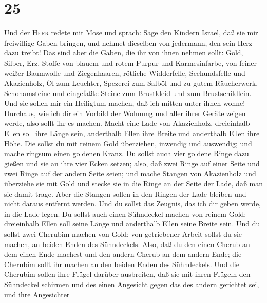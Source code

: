 \hypertarget{section-24}{%
\section{25}\label{section-24}}

 Und der \textsc{Herr} redete mit Mose und sprach:
 Sage den Kindern Israel, daß sie mir freiwillige Gaben
bringen, und nehmet dieselben von jedermann, den sein Herz dazu treibt!
 Das sind aber die Gaben, die ihr von ihnen nehmen sollt:
 Gold, Silber, Erz, Stoffe von blauem und rotem Purpur und
Karmesinfarbe, von feiner weißer Baumwolle und Ziegenhaaren,
 rötliche Widderfelle, Seehundsfelle und Akazienholz,
 Öl zum Leuchter, Spezerei zum Salböl und zu gutem
Räucherwerk,  Schohamsteine und eingefaßte Steine zum
Brustkleid und zum Brustschildlein.  Und sie sollen mir
ein Heiligtum machen, daß ich mitten unter ihnen wohne! 
Durchaus, wie ich dir ein Vorbild der Wohnung und aller ihrer Geräte
zeigen werde, also sollt ihr es machen.  Macht eine Lade
von Akazienholz, dreieinhalb Ellen soll ihre Länge sein, anderthalb
Ellen ihre Breite und anderthalb Ellen ihre Höhe.  Die
sollst du mit reinem Gold überziehen, inwendig und auswendig; und mache
ringsum einen goldenen Kranz.  Du sollst auch vier
goldene Ringe dazu gießen und sie an ihre vier Ecken setzen; also, daß
zwei Ringe auf einer Seite und zwei Ringe auf der andern Seite seien;
 und mache Stangen von Akazienholz und überziehe sie mit
Gold  und stecke sie in die Ringe an der Seite der Lade,
daß man sie damit trage.  Aber die Stangen sollen in den
Ringen der Lade bleiben und nicht daraus entfernt werden.
 Und du sollst das Zeugnis, das ich dir geben werde, in
die Lade legen.  Du sollst auch einen Sühndeckel machen
von reinem Gold; dreieinhalb Ellen soll seine Länge und anderthalb Ellen
seine Breite sein.  Und du sollst zwei Cherubim machen
von Gold; von getriebener Arbeit sollst du sie machen, an beiden Enden
des Sühndeckels.  Also, daß du den einen Cherub an dem
einen Ende machest und den andern Cherub an dem andern Ende; die
Cherubim sollt ihr machen an den beiden Enden des Sühndeckels.
 Und die Cherubim sollen ihre Flügel darüber ausbreiten,
daß sie mit ihren Flügeln den Sühndeckel schirmen und des einen
Angesicht gegen das des andern gerichtet sei, und ihre Angesichter
